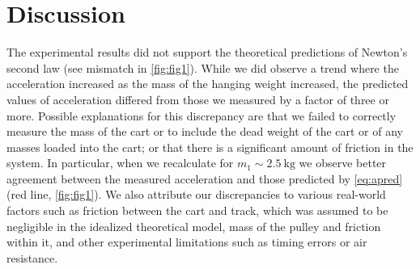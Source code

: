 ﻿\documentclass[reprint,amsmath,amssymb,aps,twoside]{revtex4-2}
\begin{document}
\section{Discussion}
The experimental results did not support the theoretical predictions of Newton's second law (see mismatch in \cref{fig:fig1}).  While we did observe a trend where the acceleration increased as the mass of the hanging weight increased, the predicted values of acceleration differed from those we measured by a factor of three or more.  Possible explanations for this discrepancy are that we failed to correctly measure the mass of the cart or to include the dead weight of the cart or of any masses loaded into the cart; or that there is a significant amount of friction in the system. In particular, when we recalculate for $m_1\sim\qty{2.5}{\kilo\gram}$ we observe better agreement between the measured acceleration and those predicted by \cref{eq:apred} (red line, \cref{fig:fig1}). We also attribute our discrepancies to various real-world factors such as friction between the cart and track, which was assumed to be negligible in the idealized theoretical model, mass of the pulley and friction within it, and other experimental limitations such as timing errors or air resistance.

\end{document}
